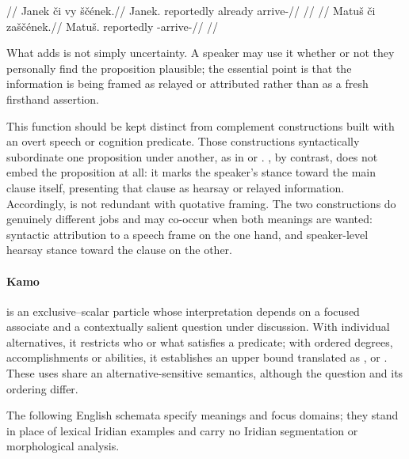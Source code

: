 \pex
\a
\begingl
\glpreamble {}//
\gla Janek či vy ščének.//
\glb Janek.\Dir{} reportedly already arrive-\Pf{}//
\glft {}//
\endgl
\a
\begingl
\glpreamble {}//
\gla Matuš či zaščének.//
\glb Matuš.\Dir{} reportedly \Neg{}-arrive-\Pf{}//
\glft {}//
\endgl
\xe

\noindent What  adds is not simply uncertainty. A speaker may use it
whether or not they personally find the proposition plausible; the essential
point is that the information is being framed as relayed or attributed rather
than as a fresh firsthand assertion.

\noindent This function should be kept distinct from complement constructions
built with an overt speech or cognition predicate. Those constructions
syntactically subordinate one proposition under another, as in  or . , by contrast, does not embed the
proposition at all: it marks the speaker's stance toward the main clause
itself, presenting that clause as hearsay or relayed information. Accordingly,
 is not redundant with quotative framing. The two constructions do
genuinely different jobs and may co-occur when both meanings are wanted:
syntactic attribution to a speech frame on the one hand, and speaker-level
hearsay stance toward the clause on the other.

\paragraph{Kamo}  is an exclusive--scalar particle whose
interpretation depends on a focused associate and a contextually salient
question under discussion. With individual alternatives, it restricts who or
what satisfies a predicate; with ordered degrees, accomplishments or abilities,
it establishes an upper bound translated as ,  or
. These uses share an alternative-sensitive semantics, although
the question and its ordering differ.

The following English schemata specify meanings and focus domains; they
stand in place of lexical Iridian examples and carry no Iridian segmentation
or morphological analysis.
\pex
\a {}
\a {}
\xe

